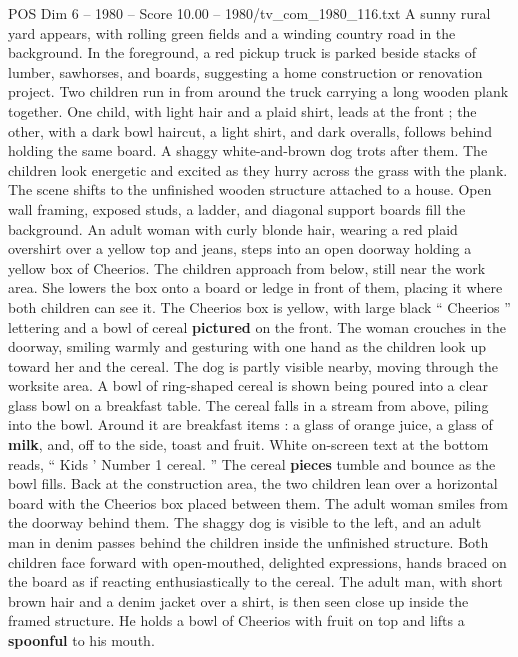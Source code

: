 \begin{textsample}{POS Dim 6 – 1980 – Score 10.00 – 1980/tv\_com\_1980\_116.txt}  \label{ex:f6_pos_039}
A sunny rural yard appears, with rolling green fields and a winding country road in the background.
In the foreground, a red pickup truck is parked beside stacks of lumber, sawhorses, and boards, suggesting a home construction or renovation project.
Two children run in from around the truck carrying a long wooden plank together.
One child, with light hair and a plaid shirt, leads at the front ; the other, with a dark bowl haircut, a light shirt, and dark overalls, follows behind holding the same board.
A shaggy white-and-brown dog trots after them.
The children look energetic and excited as they hurry across the grass with the plank.
The scene shifts to the unfinished wooden structure attached to a house.
Open wall framing, exposed studs, a ladder, and diagonal support boards fill the background.
An adult woman with curly blonde hair, wearing a red plaid overshirt over a yellow top and jeans, steps into an open doorway holding a yellow box of Cheerios.
The children approach from below, still near the work area.
She lowers the box onto a board or ledge in front of them, placing it where both children can see it.
The Cheerios box is yellow, with large black “ Cheerios ” lettering and a bowl of cereal \textbf{pictured} on the front.
The woman crouches in the doorway, smiling warmly and gesturing with one hand as the children look up toward her and the cereal.
The dog is partly visible nearby, moving through the worksite area.
A bowl of ring-shaped cereal is shown being poured into a clear glass bowl on a breakfast table.
The cereal falls in a stream from above, piling into the bowl.
Around it are breakfast items : a glass of orange juice, a glass of \textbf{milk}, and, off to the side, toast and fruit.
White on-screen text at the bottom reads, “ Kids ’ Number 1 cereal. ” The cereal \textbf{pieces} tumble and bounce as the bowl fills.
Back at the construction area, the two children lean over a horizontal board with the Cheerios box placed between them.
The adult woman smiles from the doorway behind them.
The shaggy dog is visible to the left, and an adult man in denim passes behind the children inside the unfinished structure.
Both children face forward with open-mouthed, delighted expressions, hands braced on the board as if reacting enthusiastically to the cereal.
The adult man, with short brown hair and a denim jacket over a shirt, is then seen close up inside the framed structure.
He holds a bowl of Cheerios with fruit on top and lifts a \textbf{spoonful} to his mouth.

\end{textsample}

